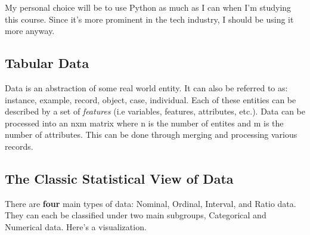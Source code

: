 \documentclass[english, 10pt]{article}
\begin{document}
My personal choice will be to use Python as much as I can when I'm studying this course. Since it's more prominent in the tech industry, I should be using it more anyway.

\subsection{Tabular Data}
Data is an abstraction of some real world entity. It can also be referred to as: instance, example, record, object, case, individual. Each of these entities can be described by a set of \textit{features} (i.e variables, features, attributes, etc.). Data can be processed into an nxm matrix where n is the number of entites and m is the number of attributes. This can be done through merging and processing various records.


\subsection{The Classic Statistical View of Data}

There are \textbf{four} main types of data: Nominal, Ordinal, Interval, and Ratio data. They can each be classified under two main subgroups, Categorical and Numerical data. Here's a visualization.\\
\end{document}
